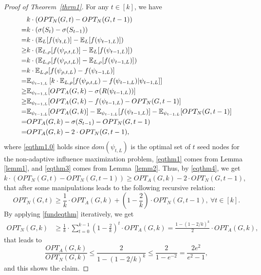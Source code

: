 \begin{proof}[Proof of Theorem~\ref{thrm1}]
For any $t\in [k]$, we have
\begin{align}
&k\cdot (OPT_N(G,t)-OPT_N(G,t-1))\nonumber\\
=&k\cdot (\sigma(S_t)-\sigma(S_{t-1}))\nonumber\\
=&k\cdot (\mathbb{E}_L[f(\psi_{t,L})]-\mathbb{E}_L[f(\psi_{t-1,L})])\nonumber\\
\geq &k\cdot (\mathbb{E}_{L,\rho}[f({\psi}_{\rho,t,L})]-\mathbb{E}_L[f(\psi_{t-1,L})])\label{eqthm1.0}\\
= &k\cdot (\mathbb{E}_{L,\rho}[f({\psi}_{\rho,t,L})]-\mathbb{E}_{L,\rho}[f(\psi_{t-1,L})])\nonumber\\
=&k\cdot \mathbb{E}_{L,\rho}[f({\psi}_{\rho,t,L})-f(\psi_{t-1,L})]\nonumber\\
=& \mathbb{E}_{\psi_{t-1,L}}\left[k\cdot \mathbb{E}_{L,\rho}[f({\psi}_{\rho,t,L})-f(\psi_{t-1,L})|\psi_{t-1,L}]\right]\nonumber\\
\geq &\mathbb{E}_{\psi_{t-1,L}}[OPT_A(G,k)-\sigma(R(\psi_{t-1,L}))]\label{eqthm1}\\
\geq &\mathbb{E}_{\psi_{t-1,L}}[OPT_A(G,k)-f(\psi_{t-1,L})-OPT_N(G,t-1)]\label{eqthm3}\\
=& \mathbb{E}_{\psi_{t-1,L}}[OPT_A(G,k)]-\mathbb{E}_{\psi_{t-1,L}}[f(\psi_{t-1,L})]-\mathbb{E}_{\psi_{t-1,L}}[OPT_N(G,t-1)]\nonumber\\
= &OPT_A(G,k)-\sigma(S_{t-1})-OPT_N(G,t-1)\nonumber\\
= &OPT_A(G,k)-2\cdot OPT_N(G,t-1)\label{eqthm4},
\end{align}
where \eqref{eqthm1.0} holds since $dom(\psi_{t,L})$ is the optimal set of $t$ seed nodes for the non-adaptive influence maximization problem, \eqref{eqthm1} comes from Lemma \ref{lemm1}, and \eqref{eqthm3} comes from Lemma~\ref{lemm2}. Thus, by \eqref{eqthm4}, we get $k\cdot (OPT_N(G,t)-OPT_N(G,t-1))\geq OPT_A(G,k)-2\cdot OPT_N(G,t-1)$, that after some manipulations leads to the following recursive relation:
\begin{equation}
OPT_N(G,t)\geq \frac{1}{k}\cdot OPT_A(G,k)+\left(1-\frac{2}{k}\right)\cdot OPT_N(G,t-1),\ \forall t\in [k].\label{fundeqthm}
\end{equation}
%
By applying \eqref{fundeqthm} iteratively, we get
\begin{align*}
    OPT_N(G,k)&\geq \frac{1}{k}\cdot \sum_{t=0}^{k-1}\left(1-\frac{2}{k}\right)^{t}\cdot OPT_A(G,k)=\frac{1-\left(1-2/k\right)^k}{2}\cdot OPT_A(G,k),
\end{align*}
that leads to 
\begin{equation*}
\frac{OPT_A(G,k)}{OPT_N(G,k)}\leq \frac{2}{1-(1-2/k)^k}\leq \frac{2}{1-e^{-2}} = \frac{2e^2}{e^{2}-1},
\end{equation*}
and this shows the claim. 
\end{proof}

